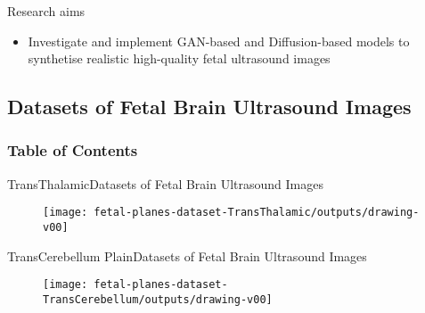 {
\begin{frame}{Research aims}

\bigSizeFont
\begin{itemize}
\item Investigate and implement GAN-based and Diffusion-based models to synthetise realistic high-quality fetal ultrasound images
\end{itemize}

\end{frame}
}


\subsection{Datasets of Fetal Brain Ultrasound Images}
\begin{frame}
  \frametitle{Table of Contents}
  \tableofcontents[currentsection]
\end{frame}


{

\begin{frame}{TransThalamic}{Datasets of Fetal Brain Ultrasound Images}
      \begin{figure}
        \centering
        \texttt{[image: fetal-planes-dataset-TransThalamic/outputs/drawing-v00]}
      \end{figure}
\end{frame}
}

{

\begin{frame}{TransCerebellum Plain}{Datasets of Fetal Brain Ultrasound Images}
      \begin{figure}
        \centering
        \texttt{[image: fetal-planes-dataset-TransCerebellum/outputs/drawing-v00]}
      \end{figure}
\end{frame}
}





